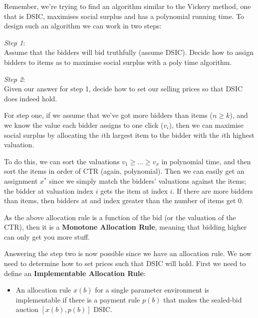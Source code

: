 Remember, we're trying to find an algorithm similar to the Vickery method, one
that is DSIC, maximises social surplus and has a polynomial running time. To
design such an algorithm we can work in two steps:

\begin{description}
  \item \textit{Step 1}:\\
    Assume that the bidders will bid truthfully (assume DSIC). Decide how to 
    assign bidders to items as to maximise social surplus with a poly time
    algorithm.
  \item \textit{Step 2}:\\
    Given our answer for step 1, decide how to set our selling prices so that
    DSIC does indeed hold.
\end{description}

For step one, if we assume that we've got more bidders than items ($n \geq k$),
and we know the value each bidder assigns to one click ($v_i$), then we can
maximise social surplus by allocating the $i$th largest item to the bidder with
the $i$th highest valuation.


To do this, we can sort the valuations $v_1 \geq \dots \geq v_x$ in polynomial
time, and then sort the items in order of CTR (again, polynomial). Then we can
easily get an assignment $x^*$ since we simply match the bidders' valuations
against the items; the bidder at valuation index $i$ gets the item at index $i$.
If there are more bidders than items, then bidders at and index greater than the
number of items get $0$.

As the above allocation rule is a function of the bid (or the valuation of the
CTR), then it is a \textbf{Monotone Allocation Rule}, meaning that bidding
higher can only get you more stuff.

Answering the step two is now possible since we have an allocation rule. We now
need to determine how to set prices such that DSIC will hold. First we need to
define an \textbf{Implementable Allocation Rule}:

\begin{itemize}
  \item[] An allocation rule $x(b)$ for a single parameter environment is 
  implementable if there is a payment rule $p(b)$ that makes the sealed-bid 
  auction $[x(b), p(b)]$ DSIC.
\end{itemize}

